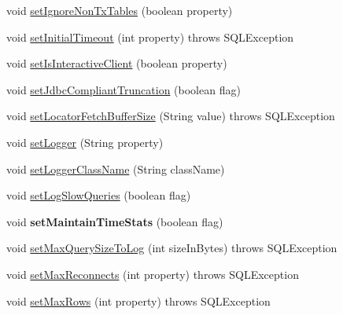 \begin{DoxyCompactItemize}
\item 
void \mbox{\hyperlink{interfacecom_1_1mysql_1_1jdbc_1_1_connection_properties_aef7c4c2447c9875392d6dff3452d9ac2}{set\+Ignore\+Non\+Tx\+Tables}} (boolean property)
\item 
void \mbox{\hyperlink{interfacecom_1_1mysql_1_1jdbc_1_1_connection_properties_aaf6a88938cc10d9607cbcba5f3ac75a2}{set\+Initial\+Timeout}} (int property)  throws S\+Q\+L\+Exception
\item 
void \mbox{\hyperlink{interfacecom_1_1mysql_1_1jdbc_1_1_connection_properties_a8157f1dda8d47aca668811bb7c932ec0}{set\+Is\+Interactive\+Client}} (boolean property)
\item 
void \mbox{\hyperlink{interfacecom_1_1mysql_1_1jdbc_1_1_connection_properties_aa770c64e002c6ab1cb335107d0380476}{set\+Jdbc\+Compliant\+Truncation}} (boolean flag)
\item 
void \mbox{\hyperlink{interfacecom_1_1mysql_1_1jdbc_1_1_connection_properties_ae7d48146159a39b7171b4b5a074466c1}{set\+Locator\+Fetch\+Buffer\+Size}} (String value)  throws S\+Q\+L\+Exception
\item 
void \mbox{\hyperlink{interfacecom_1_1mysql_1_1jdbc_1_1_connection_properties_a9ad6baf8983bc1bf352b58b0e1634be1}{set\+Logger}} (String property)
\item 
void \mbox{\hyperlink{interfacecom_1_1mysql_1_1jdbc_1_1_connection_properties_a4bde3c5c986dba54cf5ed53038cb7181}{set\+Logger\+Class\+Name}} (String class\+Name)
\item 
void \mbox{\hyperlink{interfacecom_1_1mysql_1_1jdbc_1_1_connection_properties_a7dd83438187fa5956f663b84a604dce3}{set\+Log\+Slow\+Queries}} (boolean flag)
\item 
\mbox{\label{interfacecom_1_1mysql_1_1jdbc_1_1_connection_properties_a7f939a7f52fe38b4c113103e51c868c8}} 
void {\bfseries set\+Maintain\+Time\+Stats} (boolean flag)
\item 
void \mbox{\hyperlink{interfacecom_1_1mysql_1_1jdbc_1_1_connection_properties_a65e15e4e1644fe1fb818777977237944}{set\+Max\+Query\+Size\+To\+Log}} (int size\+In\+Bytes)  throws S\+Q\+L\+Exception
\item 
void \mbox{\hyperlink{interfacecom_1_1mysql_1_1jdbc_1_1_connection_properties_aa4dbdf7b74fc014b67992de0cf9247c9}{set\+Max\+Reconnects}} (int property)  throws S\+Q\+L\+Exception
\item 
void \mbox{\hyperlink{interfacecom_1_1mysql_1_1jdbc_1_1_connection_properties_afbeac8befbc0374361e27aa4fead424a}{set\+Max\+Rows}} (int property)  throws S\+Q\+L\+Exception

\end{DoxyCompactItemize}

